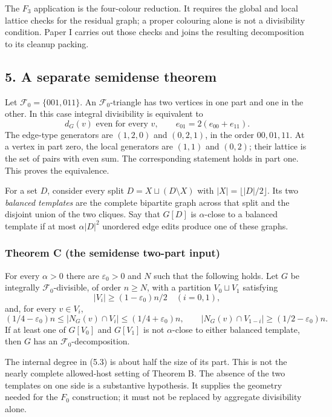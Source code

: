 \documentclass[english,11pt,a4paper]{article}
\begin{document}
The \(F_3\) application is the four-colour reduction. It requires the global and local lattice checks for the residual graph; a proper colouring alone is not a divisibility condition. Paper I carries out those checks and joins the resulting decomposition to its cleanup packing.


\subsection{5. A separate semidense theorem}\label{a-separate-semidense-theorem}

Let \(\mathcal F_0=\{001,011\}\). An \(\mathcal F_0\)-triangle has two vertices in one part and one in the other. In this case integral divisibility is equivalent to \[d_G(v)\text{ even for every }v,\qquad e_{01}=2(e_{00}+e_{11}).
\tag{5.1}\] The edge-type generators are \((1,2,0)\) and \((0,2,1)\), in the order \(00,01,11\). At a vertex in part zero, the local generators are \((1,1)\) and \((0,2)\); their lattice is the set of pairs with even sum. The corresponding statement holds in part one. This proves the equivalence.

For a set \(D\), consider every split \(D=X\sqcup(D\setminus X)\) with \(|X|=\lfloor|D|/2\rfloor\). Its two \emph{balanced templates} are the complete bipartite graph across that split and the disjoint union of the two cliques. Say that \(G[D]\) is \(\alpha\)-close to a balanced template if at most \(\alpha|D|^2\) unordered edge edits produce one of these graphs.

\subsubsection{Theorem C (the semidense two-part input)}\label{theorem-c-the-semidense-two-part-input}

For every \(\alpha>0\) there are \(\varepsilon_0>0\) and \(N\) such that the following holds. Let \(G\) be integrally \(\mathcal F_0\)-divisible, of order \(n\ge N\), with a partition \(V_0\sqcup V_1\) satisfying \[|V_i|\ge(1-\varepsilon_0)n/2\quad(i=0,1),
\tag{5.2}\] and, for every \(v\in V_i\), \[(1/4-\varepsilon_0)n\le |N_G(v)\cap V_i|\le(1/4+\varepsilon_0)n,
\qquad |N_G(v)\cap V_{1-i}|\ge(1/2-\varepsilon_0)n.
\tag{5.3}\] If at least one of \(G[V_0]\) and \(G[V_1]\) is not \(\alpha\)-close to either balanced template, then \(G\) has an \(\mathcal F_0\)-decomposition.

The internal degree in (5.3) is about half the size of its part. This is not the nearly complete allowed-host setting of Theorem B. The absence of the two templates on one side is a substantive hypothesis. It supplies the geometry needed for the \(F_0\) construction; it must not be replaced by aggregate divisibility alone.
\end{document}
